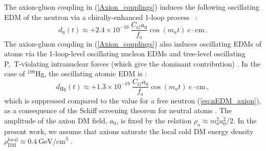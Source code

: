 The axion-gluon coupling in (\ref{Axion_couplings}) induces the following oscillating EDM of the neutron via a chirally-enhanced 1-loop process~%
\cite{tuningfootnote,Witten1979,Witten1979B,Pospelov1999}:
\begin{equation}
\label{eq:nEDM_axion}
d_\mathrm{n}(t) \approx +2.4 \times 10^{-16} ~ \frac{C_G a_0}{f_a} \cos(m_a t) ~ e \cdot \textrm{cm} \, .
\end{equation}
The axion-gluon coupling in (\ref{Axion_couplings}) also induces oscillating EDMs of atoms via the 1-loop-level oscillating nucleon EDMs and tree-level oscillating P,~T-violating intranuclear forces (which give the dominant contribution) \cite{Stadnik2014A,Flambaum1984EDM,Flambaum1984EDMB}.
In the case of $^{199}$Hg, the oscillating atomic EDM is \cite{Stadnik2014A,StadnikThesis,Flambaum1985EDM,Flambaum1985EDMB,Flambaum2002EDM,Dmitriev2003A,Dmitriev2003B,Dmitriev2005,Engel2005,Engel2010}:
\begin{equation}
\label{199Hg-EDM_axion}
d_{\textrm{Hg}}(t) \approx +1.3 \times 10^{-19} ~ \frac{C_G a_0}{f_a} \cos(m_a t) ~ e \cdot \textrm{cm} \, ,
\end{equation}
which is suppressed compared to the value for a free neutron (\ref{eq:nEDM_axion}), as a consequence of the Schiff screening theorem for neutral atoms \cite{Schiff1963}.
The amplitude of the axion DM field, $a_0$, is fixed by the relation $\rho_a \approx m_a^2 a_0^2 /2$.
In the present work, we assume that axions saturate the local cold DM energy density $\rho_{\mathrm{DM}}^{\mathrm{local}} \approx 0.4~\textrm{GeV/cm}^3$ \cite{Catena2010}.






